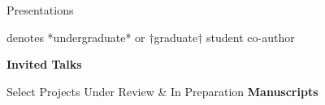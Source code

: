 \documentclass [11pt,letterpaper]{article}
\begin{document}
\begin{rSection}{\textrm{Presentations}}
%
\vspace{-1mm}\begin{center}\footnotesize{denotes *undergraduate* or $\dagger$graduate$\dagger$ student co-author}\end{center}\vspace{-3mm}
{\large {\bf Invited Talks}}\begin{etaremune}

%
\end{etaremune}
\end{rSection}
%

%
\pagebreak
\begin{rSection}{ \textrm{Select Projects Under Review \& In Preparation}}
%
%
{\large \textbf{Manuscripts}}
\begin{etaremune}
%



\begin{comment}
\hspace{-8mm}{\large \textbf{Presentations}}

\end{comment}
\end{etaremune}\end{rSection}
%
%
\end{document}
